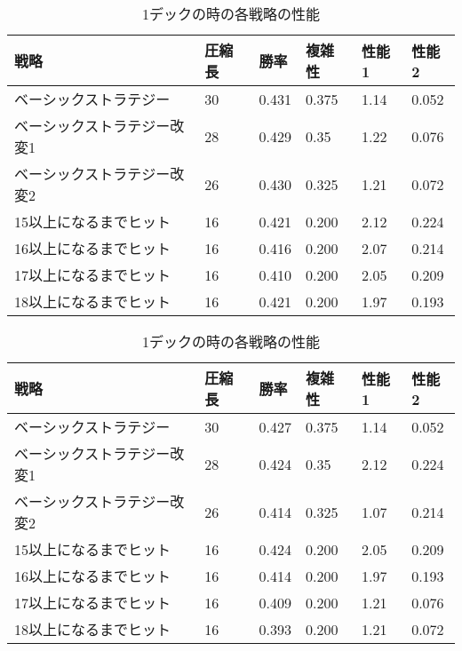 
\begin{table}[H]
\caption{1デックの時の各戦略の性能}
\label{table:data_type}
\begin{center}
\begin{tabular}{llllll}
戦略           & 圧縮長 & 勝率    & 複雑性   & 性能1  & 性能2   \\ \hline
ベーシックストラテジー         & 30  & 0.431 & 0.375 & 1.14 & 0.052 \\
ベーシックストラテジー改変1      & 28  & 0.429 & 0.35  & 1.22 & 0.076 \\
ベーシックストラテジー改変2      & 26  & 0.430 & 0.325 & 1.21 & 0.072 \\
15以上になるまでヒット & 16  & 0.421 & 0.200 & 2.12 & 0.224 \\
16以上になるまでヒット & 16  & 0.416 & 0.200 & 2.07 & 0.214 \\
17以上になるまでヒット & 16  & 0.410 & 0.200 & 2.05 & 0.209 \\
18以上になるまでヒット & 16  & 0.421 & 0.200 & 1.97 & 0.193
\end{tabular}
\end{center}
\end{table}



\begin{table}[H]
\caption{1デックの時の各戦略の性能}
\label{table:data_type}
\begin{center}
\begin{tabular}{llllll}
戦略           & 圧縮長 & 勝率    & 複雑性   & 性能1  & 性能2   \\ \hline
ベーシックストラテジー         & 30  & 0.427 & 0.375 & 1.14 & 0.052 \\
ベーシックストラテジー改変1      & 28  & 0.424 & 0.35  & 2.12 & 0.224 \\
ベーシックストラテジー改変2      & 26  & 0.414 & 0.325 & 1.07 & 0.214 \\
15以上になるまでヒット & 16  & 0.424 & 0.200 & 2.05 & 0.209 \\
16以上になるまでヒット & 16  & 0.414 & 0.200 & 1.97 & 0.193 \\
17以上になるまでヒット & 16  & 0.409 & 0.200 & 1.21 & 0.076 \\
18以上になるまでヒット & 16  & 0.393 & 0.200 & 1.21 & 0.072
\end{tabular}
\end{center}
\end{table}

